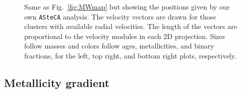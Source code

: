 \documentclass[referee]{aa}
\begin{document}
  \begin{figure}
   \caption{Same as Fig.~\ref{fig:MWmap} but showing the positions given by our
   own \texttt{ASteCA} analysis. The velocity vectors are drawn for those
   clusters with available radial velocities. The length of the vectors are
   proportional to the velocity modules in each 2D projection. Sizes follow
   masses and colors follow ages, metallicities, and binary fractions, for the
   left, top right, and bottom right plots, respectively. }
   \label{fig:MWmap_vectors}
  \end{figure}






 \subsection{Metallicity gradient}
  \label{ssec:met_gradient}

\end{document}
